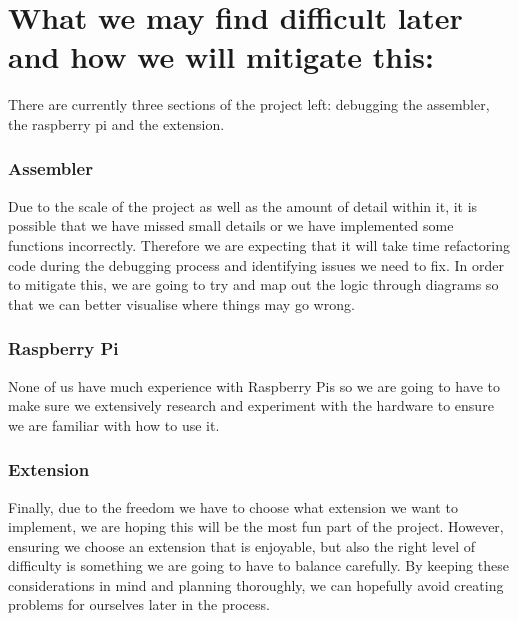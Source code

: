 \documentclass[11pt]{article}
\begin{document}
{}

\hypertarget{h.aw2vc64c15c5}{%
\section{\texorpdfstring{{What we may find difficult later and how we
will mitigate
this:}}{What we may find difficult later and how we will mitigate this:}}\label{h.aw2vc64c15c5}}

{}

{There are currently three sections of the project left: debugging the
assembler, the raspberry pi and the extension.}

{}

\hypertarget{h.9evstpd5lucx}{%
\subsubsection{\texorpdfstring{{Assembler}}{Assembler}}\label{h.9evstpd5lucx}}

{Due to the scale of the project as well as the amount of detail within
it, it is possible that we have missed small details or we have
implemented some functions incorrectly. Therefore we are expecting that
it will take time refactoring code during the debugging process and
identifying issues we need to fix. In order to mitigate this, we are
going to try and map out the logic through diagrams so that we can
better visualise where things may go wrong.}

{}

\hypertarget{h.eo3he32ltesq}{%
\subsubsection{\texorpdfstring{{Raspberry
Pi}}{Raspberry Pi}}\label{h.eo3he32ltesq}}

{None of us have much experience with Raspberry Pis so we are going to
have to make sure we extensively research and experiment with the
hardware to ensure we are familiar with how to use it. }

{}

\hypertarget{h.8pkeeyy43oom}{%
\subsubsection{\texorpdfstring{{Extension}}{Extension}}\label{h.8pkeeyy43oom}}

{Finally, due to the freedom we have to choose what extension we want to
implement, we are hoping this will be the most fun part of the project.
However, ensuring we choose an extension that is enjoyable, but also the
right level of difficulty is something we are going to have to balance
carefully. By keeping these considerations in mind and planning
thoroughly, we can hopefully avoid creating problems for ourselves later
in the process.}
\end{document}
